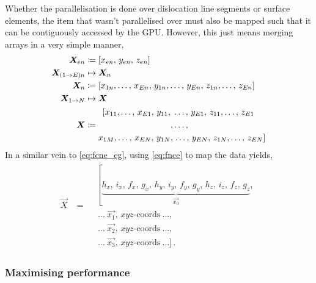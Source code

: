 Whether the parallelisation is done over dislocation line segments or surface elements, the item that wasn't parallelised over must also be mapped such that it can be contiguously accessed by the GPU. However, this just means merging arrays in a very simple manner,
\begin{subequations}\label{eq:fnce}
    \begin{align}
        \vec{X}_{en}        & \coloneqq \left[x_{en},\, y_{en},\, z_{en}\right]                                                    \\
        \vec{X}_{(1\to E)n} & \mapsto \vec{X}_{n} \nn
        \vec{X}_{n}         & \coloneqq \left[x_{1n},\ldots,\, x_{En},\, y_{1n},\ldots,\, y_{En},\, z_{1n},\ldots,\, z_{En}\right] \\
        \vec{X}_{1\to N}    & \mapsto \vec{X}\nn
        \vec{X}             & \coloneqq
        \begin{aligned}
            \left[x_{11},\ldots,\, x_{E1},\, y_{11},\right. & \ldots,\, y_{E1},\, z_{11},\ldots,\, z_{E1}              \\
            ,                                               & \ldots,                                                  \\
            x_{1M},\ldots,\, x_{EN},\, y_{1N},              & \left.\ldots,\, y_{EN},\, z_{1N},\ldots,\, z_{EN}\right]
        \end{aligned}
    \end{align}
\end{subequations}
In a similar vein to \cref{eq:fcne_eg}, using \cref{eq:fnce} to map the data yields,
\begin{align}\label{eq:fnce_eg}
    \vec{X} & = \begin{aligned}
         & \left[\underbrace{h_{x},\, i_{x},\, f_{x},\, g_{x},\,
            h_{y},\, i_{y},\, f_{y},\, g_{y},\,
        h_{z},\, i_{z},\, f_{z},\, g_{z}}_{\vec{x_{0}}}\right.,  \\
         & ~\ldots~\vec{x_{1}},\, xyz\textrm{-coords}~\ldots,    \\
         & ~\ldots~\vec{x_{2}},\, xyz\textrm{-coords}~\ldots,    \\
         & ~\ldots~\vec{x_{3}},\, xyz\textrm{-coords}~\ldots]\,.
    \end{aligned}
\end{align}

\subsubsection{Maximising performance}


